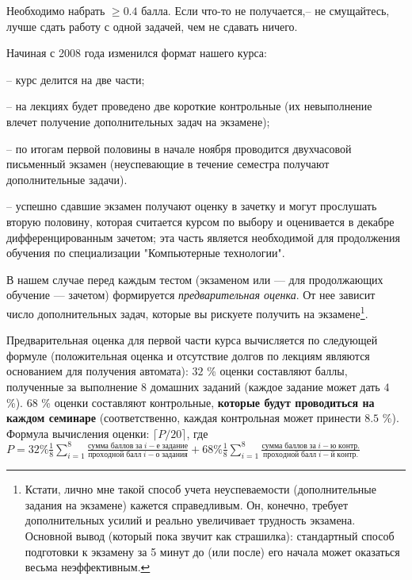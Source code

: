 \documentclass[10pt,twocolumn]{article}
\begin{document}
{\footnotesize Необходимо набрать $\geq 0.4$ балла. Если что-то не
получается,-- не смущайтесь, лучше  сдать работу с одной задачей, чем
не сдавать ничего.

Начиная с 2008 года изменился формат нашего курса:

-- курс делится на две части;

-- на лекциях будет проведено две короткие контрольные (их невыполнение влечет получение дополнительных задач на экзамене);

-- по итогам первой половины в начале  ноября  проводится двухчасовой 
письменный экзамен (неуспевающие в течение семестра получают 
дополнительные задачи).

-- успешно сдавшие экзамен получают оценку в зачетку и могут прослушать вторую половину,
которая считается курсом по выбору и оценивается в декабре дифференцированным зачетом; 
эта часть является необходимой для продолжения обучения
по специализации "Компьютерные технологии". 

В нашем случае перед каждым тестом (экзаменом или --- для продолжающих обучение --- зачетом) 
формируется {\em предварительная оценка}.
От нее зависит число дополнительных задач, которые вы рискуете получить на экзамене\footnote{Кстати, 
лично мне такой способ учета неуспеваемости (дополнительные задания на экзамене) кажется 
справедливым. Он, конечно, требует дополнительных усилий и реально увеличивает трудность экзамена. 
Основной вывод (который пока звучит как страшилка): стандартный способ подготовки к 
экзамену за 5 минут до (или после) его начала
может оказаться весьма неэффективным.}.

Предварительная оценка для первой части курса вычисляется по следующей формуле
(положительная оценка и отсутствие долгов по лекциям являются основанием для получения автомата):
$32$ \%
оценки  составляют баллы, полученные за
выполнение $8$ домашних заданий (каждое задание может дать $4$
\%).  $68$ \% оценки составляют контрольные, {\bf которые будут
проводиться на каждом семинаре} (соответственно, каждая контрольная
может принести $8.5$ \%).   Формула вычисления оценки:
$\lceil P/20 \rceil$, где $ P= 32\%
\frac{1}{8}\sum_{i=1}^{8}{\frac{сумма\; баллов\; за\; i-е\;
задание}{проходной\; балл\; i-о\; задания}} +68\%
\frac{1}{8}\sum_{i=1}^{8}{\frac{сумма\; баллов\; за\; i-ю\;
контр.}{проходной\; балл\; i-й\; контр.}}$

}
\end{document}
